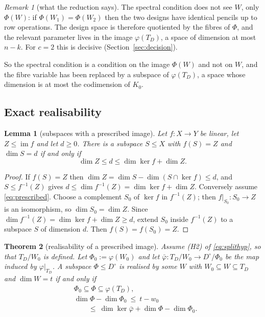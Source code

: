 \documentclass[journal]{IEEEtran}
\theoremstyle{plainn}
\newtheorem{thm}{Theorem}
\newtheorem{lem}[thm]{Lemma}
\theoremstyle{remark}
\newtheorem{remark}{Remark}
\begin{document}
\begin{remark}[what the reduction says]\label{rem:whatreduction}
The spectral condition does not see $W$, only $\Phi(W)$: if $\Phi(W_1)=\Phi(W_2)$ then the two designs
have identical pencils up to row operations. The design space is therefore quotiented by the fibres of
$\Phi$, and the relevant parameter lives in the image $\varphi(T_D)$, a space of dimension at most $n-k$.
For $c=2$ this is decisive (Section~\ref{sec:decision}).
\end{remark}

So the spectral condition is a condition on the image $\Phi(W)$ and not on $W$, and the fibre variable
has been replaced by a subspace of $\varphi(T_D)$, a space whose dimension is at most the codimension of
$K_0$.

\subsection{Exact realisability}\label{sec:reduction:b}

\begin{lem}[subspaces with a prescribed image]\label{lem:prescribed}
Let $f:X\to Y$ be linear, let $Z\le\operatorname{im}f$ and let $d\ge0$. There is a subspace $S\le X$
with $f(S)=Z$ and $\dim S=d$ if and only if
\begin{equation}\label{eq:prescribed}
\dim Z\le d\le\dim\ker f+\dim Z .
\end{equation}
\end{lem}

\begin{proof}
If $f(S)=Z$ then $\dim Z=\dim S-\dim(S\cap\ker f)\le d$, and $S\le f^{-1}(Z)$ gives
$d\le\dim f^{-1}(Z)=\dim\ker f+\dim Z$. Conversely assume \eqref{eq:prescribed}. Choose a complement
$S_0$ of $\ker f$ in $f^{-1}(Z)$; then $f|_{S_0}:S_0\to Z$ is an isomorphism, so $\dim S_0=\dim Z$.
Since $\dim f^{-1}(Z)=\dim\ker f+\dim Z\ge d$, extend $S_0$ inside $f^{-1}(Z)$ to a subspace $S$ of
dimension $d$. Then $f(S)=f(S_0)=Z$.
\end{proof}

\begin{thm}[realisability of a prescribed image]\label{thm:realize}
Assume (H2) of \eqref{eq:splithyp}, so that $T_D/W_0$ is defined. Let $\Phi_0:=\varphi(W_0)$ and let
$\bar\varphi:T_D/W_0\to D^\circ/\Phi_0$ be the map induced by
$\varphi|_{T_D}$. A subspace $\Phi\le D^\circ$ is realised by
some $W$ with $W_0\subseteq W\subseteq T_D$ and $\dim W=t$ if and only if
\begin{equation}\label{eq:realize}
\begin{aligned}
&\Phi_0\subseteq\Phi\subseteq\varphi(T_D),\\
&\dim\Phi-\dim\Phi_0\ \le\ t-w_0\\
&\qquad\le\ \dim\ker\bar\varphi+\dim\Phi-\dim\Phi_0 .
\end{aligned}
\end{equation}
\end{thm}
\end{document}
